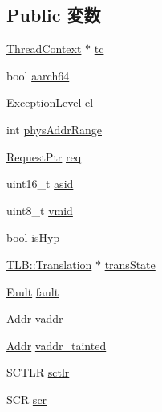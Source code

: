 \subsection*{Public 変数}
\begin{DoxyCompactItemize}
\item 
\hyperlink{classThreadContext}{ThreadContext} $\ast$ \hyperlink{classArmISA_1_1TableWalker_1_1WalkerState_a4455a4759e69e5ebe68ae7298cbcc37d}{tc}
\item 
bool \hyperlink{classArmISA_1_1TableWalker_1_1WalkerState_a52c06c8a54293998f3e1f71cdbd916f7}{aarch64}
\item 
\hyperlink{namespaceArmISA_a16588a7a92eb985c3341b7f706c81dd5}{ExceptionLevel} \hyperlink{classArmISA_1_1TableWalker_1_1WalkerState_a878510cdbf1a6438f83754acbdbf759a}{el}
\item 
int \hyperlink{classArmISA_1_1TableWalker_1_1WalkerState_a54248d4ad3bc4c54e33a04257ee09280}{physAddrRange}
\item 
\hyperlink{classRequest}{RequestPtr} \hyperlink{classArmISA_1_1TableWalker_1_1WalkerState_a956cd41d82347558b9c0a5b0474903f2}{req}
\item 
uint16\_\-t \hyperlink{classArmISA_1_1TableWalker_1_1WalkerState_a984a2dcfd9509ab586bee117bb2a7cfb}{asid}
\item 
uint8\_\-t \hyperlink{classArmISA_1_1TableWalker_1_1WalkerState_add293169f7f2ac526b3fa14f950cf0bb}{vmid}
\item 
bool \hyperlink{classArmISA_1_1TableWalker_1_1WalkerState_a104c09577173edc4f8ce6814cc33f0ae}{isHyp}
\item 
\hyperlink{classBaseTLB_1_1Translation}{TLB::Translation} $\ast$ \hyperlink{classArmISA_1_1TableWalker_1_1WalkerState_ab84349f9e7472233bc23dfdc0968ba57}{transState}
\item 
\hyperlink{classRefCountingPtr}{Fault} \hyperlink{classArmISA_1_1TableWalker_1_1WalkerState_a68714ceb74c60ea7ef5dec335bb6c5d7}{fault}
\item 
\hyperlink{classm5_1_1params_1_1Addr}{Addr} \hyperlink{classArmISA_1_1TableWalker_1_1WalkerState_a9f933b300ef63eea367ca82f8da31025}{vaddr}
\item 
\hyperlink{classm5_1_1params_1_1Addr}{Addr} \hyperlink{classArmISA_1_1TableWalker_1_1WalkerState_a1ebff4da206a1799d70b4ec129c33c5a}{vaddr\_\-tainted}
\item 
SCTLR \hyperlink{classArmISA_1_1TableWalker_1_1WalkerState_a43c4d132ca97c6cc5358f7be3c2b5a69}{sctlr}
\item 
SCR \hyperlink{classArmISA_1_1TableWalker_1_1WalkerState_ace0bf26677706ecff809bd4c76d33c8c}{scr}

\end{DoxyCompactItemize}
